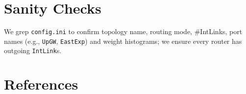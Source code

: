 \documentclass[11pt]{article}
\begin{document}
\section{Sanity Checks}
We grep \texttt{config.ini} to confirm topology name, routing mode, \#IntLinks, port names (e.g., \texttt{UpGW}, \texttt{EastExp}) and weight histograms; we ensure every router has outgoing \texttt{IntLink}s.

\section*{References}


\end{document}
